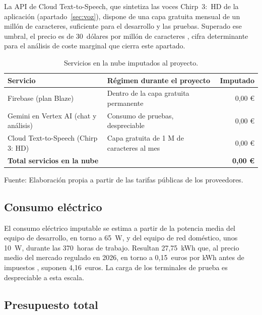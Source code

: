 La API de Cloud Text-to-Speech, que sintetiza las voces Chirp~3:~HD de la aplicación (apartado~\ref{sec:voz}), dispone de una capa gratuita mensual de un millón de caracteres, suficiente para el desarrollo y las pruebas. Superado ese umbral, el precio es de 30~dólares por millón de caracteres \citep{TTSPricing}, cifra determinante para el análisis de coste marginal que cierra este apartado.

\begin{table}[htbp]
    \centering
    \caption{Servicios en la nube imputados al proyecto.}
    \label{tab:coste-servicios}
    \begin{tabularx}{\textwidth}{@{}>{\RaggedRight\arraybackslash}X >{\RaggedRight\arraybackslash}X r@{}}
        \toprule
        \textbf{Servicio} & \textbf{Régimen durante el proyecto} & \textbf{Imputado} \\
        \midrule
        Firebase (plan Blaze)          & Dentro de la capa gratuita permanente & 0,00 € \\
        Gemini en Vertex AI (chat y análisis) & Consumo de pruebas, despreciable & 0,00 € \\
        Cloud Text-to-Speech (Chirp 3: HD) & Capa gratuita de 1 M de caracteres al mes & 0,00 € \\
        \midrule
        \textbf{Total servicios en la nube} &                                  & \textbf{0,00 €} \\
        \bottomrule
    \end{tabularx}

    \vspace{2pt}
    {\footnotesize Fuente: Elaboración propia a partir de las tarifas públicas de los proveedores.}
\end{table}

\subsection{Consumo eléctrico}

El consumo eléctrico imputable se estima a partir de la potencia media del equipo de desarrollo, en torno a 65~W, y del equipo de red doméstico, unos 10~W, durante las 370~horas de trabajo. Resultan 27,75~kWh que, al precio medio del mercado regulado en 2026, en torno a 0,15~euros por kWh antes de impuestos \citep{PrecioLuz2026}, suponen 4,16~euros. La carga de los terminales de prueba es despreciable a esta escala.

\subsection{Presupuesto total}

